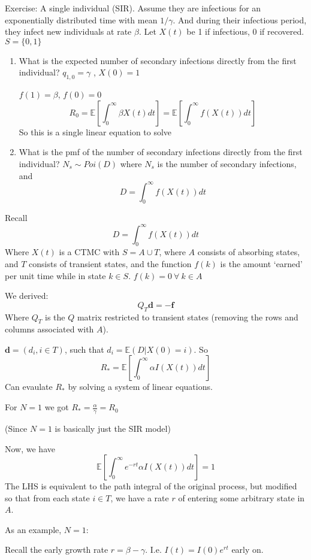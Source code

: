\documentclass{X:/Documents/Coding/Latex/myassignment}
\begin{document}
Exercise: A single individual (SIR).
Assume they are infectious for an exponentially distributed time with mean $1/\gamma$. And during their infectious period, they infect new individuals at rate $\beta$.
Let $X(t)$ be 1 if infectious, 0 if recovered. $S = \{0,1\}$ 
\begin{enumerate}
    \item What is the expected number of secondary infections directly from the first individual?
    $q_{1,0} = \gamma$ , $X(0) =1$

    $f(1) = \beta$, $f(0) = 0$
    \[R_0 = \mathbb{E}\left[\int_0^\infty \beta X(t) dt\right] = \mathbb{E}\left[\int_0^\infty f(X(t)) dt\right]\]
    So this is a single linear equation to solve

    \item What is the pmf of the number of secondary infections directly from the first individual?
    $N_s \sim Poi(D)$ where 
    $N_s$ is the number of secondary infections, and 
    \[D = \int_0^\infty f(X(t)) dt\]

\end{enumerate}



Recall
\[D = \int_0^\infty f(X(t)) dt\]
Where $X(t)$ is a CTMC with $S = A\cup T$, where $A$ consists of absorbing states, and $T$ consists of transient states, and the function $f(k)$ is the amount `earned' per unit time while in state $k\in S$. $f(k) = 0 \ \forall \ k \in A$

We derived:
\[Q_T \mathbf{d} = - \mathbf{f}\]
Where $Q_T$ is the $Q$ matrix restricted to transient states (removing the rows and columns associated with $A$). 

$\mathbf{d} = (d_i, i \in T)$, such that $d_i = \mathbb{E}(D | X(0) = i)$. So
\[R_* = \mathbb{E}\left[\int_0^\infty \alpha I(X(t)) dt\right]\]
Can evaulate $R_*$ by solving a system of linear equations.

For $N=1$ we got $R_* = \frac{\alpha}{\gamma} = R_0$

(Since $N=1$ is basically just the SIR model)


Now, we have
\[ \mathbb{E}\left[\int_0^\infty e^{-rt} \alpha I(X(t)) dt\right]=1\]
The LHS is equivalent to the path integral of the original process, but modified so that from each state $i\in T$, we have a rate $r$ of entering some arbitrary state in $A$.


As an example, $N=1$:

Recall the early growth rate $r = \beta- \gamma$. I.e. $I(t) = I(0) e^{rt}$ early on.
\end{document}
